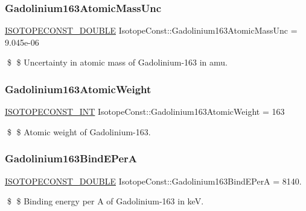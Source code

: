 \subsubsection{\texorpdfstring{Gadolinium163\+Atomic\+Mass\+Unc}{Gadolinium163AtomicMassUnc}}
{\footnotesize\ttfamily \mbox{\hyperlink{group___isotope_const-_macros_ga8f45a7272ce02c0b4c65c44636ed719a}{I\+S\+O\+T\+O\+P\+E\+C\+O\+N\+S\+T\+\_\+\+D\+O\+U\+B\+LE}} Isotope\+Const\+::\+Gadolinium163\+Atomic\+Mass\+Unc = 9.\+045e-\/06}

\$ \$ Uncertainty in atomic mass of Gadolinium-\/163 in amu. \mbox{\label{group___isotope_const-_gadolinium-_gd163_ga1bdc0b8610503dcbbec129d120dc49f1}} 
\subsubsection{\texorpdfstring{Gadolinium163\+Atomic\+Weight}{Gadolinium163AtomicWeight}}
{\footnotesize\ttfamily \mbox{\hyperlink{group___isotope_const-_macros_ga5f18360b3e99483a35c32d789e62621c}{I\+S\+O\+T\+O\+P\+E\+C\+O\+N\+S\+T\+\_\+\+I\+NT}} Isotope\+Const\+::\+Gadolinium163\+Atomic\+Weight = 163}

\$ \$ Atomic weight of Gadolinium-\/163. \mbox{\label{group___isotope_const-_gadolinium-_gd163_gab24a7c94be745a0adb2334dcdbf11bc9}} 
\subsubsection{\texorpdfstring{Gadolinium163\+Bind\+E\+PerA}{Gadolinium163BindEPerA}}
{\footnotesize\ttfamily \mbox{\hyperlink{group___isotope_const-_macros_ga8f45a7272ce02c0b4c65c44636ed719a}{I\+S\+O\+T\+O\+P\+E\+C\+O\+N\+S\+T\+\_\+\+D\+O\+U\+B\+LE}} Isotope\+Const\+::\+Gadolinium163\+Bind\+E\+PerA = 8140.}

\$ \$ Binding energy per A of Gadolinium-\/163 in keV. \mbox{\label{group___isotope_const-_gadolinium-_gd163_gac771f7b78102cbe16f2468925f28ee93}} 
